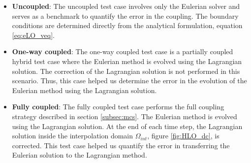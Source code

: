 \begin{itemize}
\item \textbf{Uncoupled}: The uncoupled test case involves only the Eulerian solver and serves as a benchmark to quantify the error in the coupling. The boundary conditions are determined directly from the analytical formulation, equation \ref{eq:eLO_veq}.
\item \textbf{One-way coupled}: The one-way coupled test case is a partially coupled hybrid test case where the Eulerian method is evolved using the Lagrangian solution. The correction of the Lagrangian solution is not performed in this scenario. Thus, this case helped us determine the error in the evolution of the Eulerian method using the Lagrangian solution.
\item \textbf{Fully coupled}: The fully coupled test case performs the full coupling strategy described in section \ref{subsec:mcs}. The Eulerian method is evolved using the Lagrangian solution. At the end of each time step, the Lagrangian solution inside the interpolation domain $\Omega_{int}$, figure \ref{fig:HLO_dc}, is corrected. This test case helped us quantify the error in transferring the Eulerian solution to the Lagrangian method.
\end{itemize}
	

